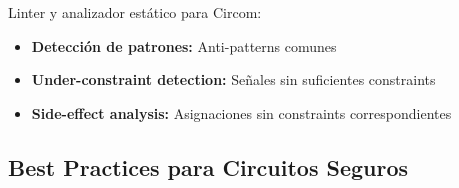 \documentclass[11pt,a4paper,twoside]{book}
\begin{document}
\begin{definition}[Circomspect]
Linter y analizador est\'atico para Circom:
\begin{itemize}
    \item \textbf{Detecci\'on de patrones:} Anti-patterns comunes
    \item \textbf{Under-constraint detection:} Se\~nales sin suficientes constraints
    \item \textbf{Side-effect analysis:} Asignaciones sin constraints correspondientes
\end{itemize}
\end{definition}

\subsection{Best Practices para Circuitos Seguros}
\end{document}
